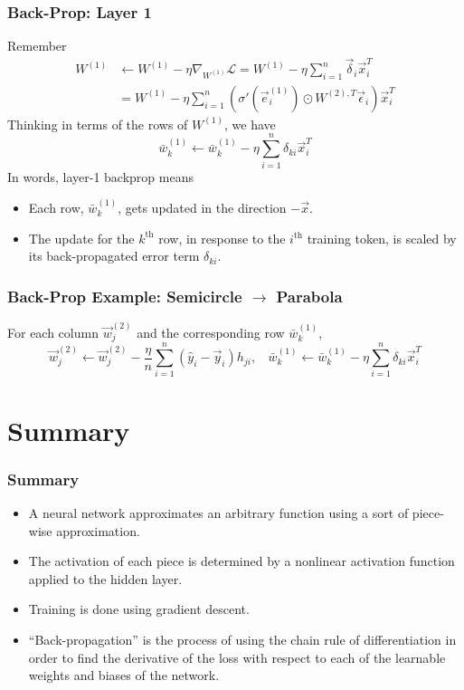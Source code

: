 \documentclass{beamer}
\begin{document}
\begin{frame}
  \frametitle{Back-Prop: Layer 1}
  Remember
  \begin{align*}
    W^{(1)} &\leftarrow W^{(1)}-\eta\nabla_{W^{(1)}}{\mathcal L}
    = W^{(1)}-\eta\sum_{i=1}^n \vec\delta_i\vec{x}_i^T\\
    &= W^{(1)}-\eta\sum_{i=1}^n \left(\sigma'(\vec{e}_i^{(1)})\odot W^{(2),T}\vec\epsilon_i\right)\vec{x}_i^T
  \end{align*}
  Thinking in terms of the rows of $W^{(1)}$, we have
  \[
  \bar{w}_k^{(1)} \leftarrow
  \bar{w}_k^{(1)}-\eta\sum_{i=1}^n\delta_{ki}\vec{x}_i^T
  \]
  In words, layer-1 backprop means
  \begin{itemize}
  \item Each row, $\bar{w}_k^{(1)}$, gets updated in the direction
    $-\vec{x}$.
  \item The update for the $k^{\textrm{th}}$ row, in response to
    the $i^{\textrm{th}}$ training token, is scaled by its
    back-propagated error term $\delta_{ki}$.
  \end{itemize}
\end{frame}

\begin{frame}
  \frametitle{Back-Prop Example: Semicircle $\rightarrow$ Parabola}
  For each column $\vec{w}_j^{(2)}$ and the corresponding row $\bar{w}_k^{(1)}$,
  \[
  \vec{w}_j^{(2)} \leftarrow
  \vec{w}_j^{(2)}-\frac{\eta}{n}\sum_{i=1}^n \left(\hat{y}_i-\vec{y}_i\right)h_{ji},~~~~
  \bar{w}_k^{(1)} \leftarrow
  \bar{w}_k^{(1)}-\eta\sum_{i=1}^n\delta_{ki}\vec{x}_i^T
  \]
  \centerline{}
\end{frame}

\section[Summary]{Summary}
\setcounter{subsection}{1}

\begin{frame}
  \frametitle{Summary}
  \begin{itemize}
  \item A neural network approximates an arbitrary function using a sort of piece-wise approximation.
  \item The activation of each piece is determined by a nonlinear activation function applied to
    the hidden layer.
  \item Training is done using gradient descent.
  \item ``Back-propagation'' is the process of using the chain rule of differentiation
    in order to find the derivative of the loss with respect to each of the learnable weights
    and biases of the network.
  \end{itemize}
\end{frame}
    
\end{document}
